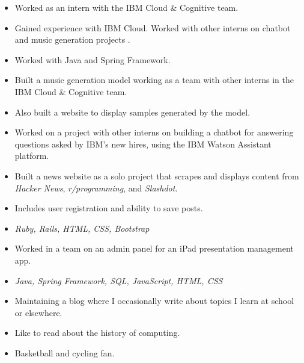 
\begin{itemize}
    \item Worked as an intern with the IBM Cloud \& Cognitive team. 
    \item Gained experience with IBM Cloud. Worked with other interns on chatbot and music generation projects . 
\end{itemize}

\begin{itemize}
    \item Worked with Java and Spring Framework. 
\end{itemize}


\begin{itemize}
	\item Built a music generation model working as a team with other interns in the IBM Cloud \& Cognitive team.
	\item Also built a website to display samples generated by the model. 
\end{itemize}

\begin{itemize}
	\item Worked on a project with other interns on building a chatbot for answering questions asked by IBM's new hires, using the IBM Watson Assistant platform. 
\end{itemize}

\begin{itemize}
	\item Built a news website as a solo project that scrapes and displays content from \textit{Hacker News}, \textit{r/programming}, and \textit{Slashdot}.
	\item Includes user registration and ability to save posts.
	\item \textit{Ruby, Rails, HTML, CSS, Bootstrap}
\end{itemize}

\begin{itemize}
    \item Worked in a team on an admin panel for an iPad presentation management app.
    \item \textit{Java, Spring Framework, SQL, JavaScript, HTML, CSS}
\end{itemize}

\smallskip

\begin{itemize}
\item Maintaining a blog where I occasionally write about topics I learn at school or elsewhere.
\item Like to read about the history of computing.
\item Basketball and cycling fan.
\end{itemize}

    


